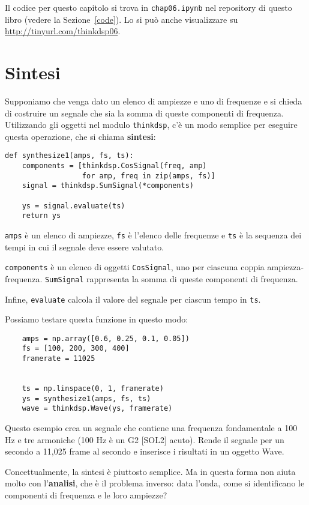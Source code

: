\documentclass[12pt,a4paper]{book}
\begin{document}
Il codice per questo capitolo si trova in {\tt chap06.ipynb} nel repository di questo libro (vedere la Sezione~\ref{code}). Lo si può anche visualizzare su \url{http://tinyurl.com/thinkdsp06}.

\section{Sintesi} \label{synth1} 

Supponiamo che venga dato un elenco di ampiezze e uno di frequenze e si chieda di costruire un segnale che sia la somma di queste componenti di frequenza. Utilizzando gli oggetti nel modulo {\tt thinkdsp}, c'è un modo semplice per eseguire questa operazione, che si chiama {\bf sintesi}:

\begin{verbatim} 
def synthesize1(amps, fs, ts):
    components = [thinkdsp.CosSignal(freq, amp)
                  for amp, freq in zip(amps, fs)]
    signal = thinkdsp.SumSignal(*components)

    ys = signal.evaluate(ts)
    return ys
 \end{verbatim} 

{\tt amps} è un elenco di ampiezze, {\tt fs} è l'elenco delle frequenze e {\tt ts} è la sequenza dei tempi in cui il segnale deve essere valutato.

{\tt components} è un elenco di oggetti {\tt CosSignal}, uno per ciascuna coppia ampiezza-frequenza. {\tt SumSignal} rappresenta la somma di queste componenti di frequenza.

Infine, {\tt evaluate} calcola il valore del segnale per ciascun tempo in {\tt ts}.

Possiamo testare questa funzione in questo modo:

\begin{verbatim} 
    amps = np.array([0.6, 0.25, 0.1, 0.05])
    fs = [100, 200, 300, 400]
    framerate = 11025


    ts = np.linspace(0, 1, framerate)
    ys = synthesize1(amps, fs, ts)
    wave = thinkdsp.Wave(ys, framerate)
 \end{verbatim} 

Questo esempio crea un segnale che contiene una frequenza fondamentale a 100 Hz e tre armoniche (100 Hz è un G2 [SOL2] acuto). Rende il segnale per un secondo a 11,025 frame al secondo e inserisce i risultati in un oggetto Wave.

Concettualmente, la sintesi è piuttosto semplice. Ma in questa forma non aiuta molto con l'{\bf analisi}, che è il problema inverso: data l'onda, come si identificano le componenti di frequenza e le loro ampiezze?
\end{document}
